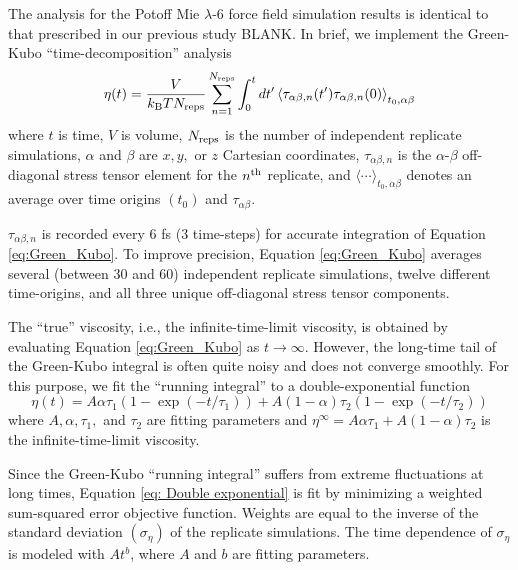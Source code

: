 \documentclass[preprint,review,12pt]{elsarticle}
\begin{document}
	The analysis for the Potoff Mie $\lambda$-6 force field simulation results is identical to that prescribed in our previous study BLANK. In brief, we implement the Green-Kubo ``time-decomposition'' analysis \cite{Maginn2018,Zhang2015}
	\begin{equation} \label{eq:Green_Kubo}
	\eta(t) = \frac{V}{k_{\rm B} T N_{\rm reps}} \sum_{n=1}^{N_{\rm reps}} \int_{0}^{t}dt'\left\langle \tau_{\alpha\beta,n}(t') \tau_{\alpha\beta,n}(0)\right\rangle_{t_0,\alpha\beta}
	\end{equation} 
	where $t$ is time, $V$ is volume, $N_{\rm reps}$ is the number of independent replicate simulations, $\alpha$ and $\beta$ are $x, y, $ or $z$ Cartesian coordinates, $\tau_{\alpha\beta,n}$ is the $\alpha$-$\beta$ off-diagonal stress tensor element for the $n^{\rm th}$ replicate, and $\langle \cdots \rangle_{t_0,\alpha\beta}$ denotes an average over time origins $(t_0)$ and $\tau_{\alpha\beta}$. 
	
	$\tau_{\alpha\beta,n}$ is recorded every 6 fs (3 time-steps) for accurate integration of Equation \ref{eq:Green_Kubo}. To improve precision, Equation \ref{eq:Green_Kubo} averages several (between 30 and 60) independent replicate simulations, twelve different time-origins, and all three unique off-diagonal stress tensor components.
	
	The ``true'' viscosity, i.e., the infinite-time-limit viscosity, is obtained by evaluating Equation \ref{eq:Green_Kubo} as $t \rightarrow \infty$. However, the long-time tail of the Green-Kubo integral is often quite noisy and does not converge smoothly. For this purpose, we fit the ``running integral'' to a double-exponential function
	\begin{equation} \label{eq: Double exponential}
	\eta(t) = A \alpha \tau_1 \left(1-\exp{(-t/\tau_1)}\right) + A (1-\alpha) \tau_2 \left(1-\exp{(-t/\tau_2)}\right)
	\end{equation}
	where $A, \alpha, \tau_1, $ and $\tau_2$ are fitting parameters and $\eta^\infty = A \alpha \tau_1 + A (1-\alpha) \tau_2$ is the infinite-time-limit viscosity. 
		
	Since the Green-Kubo ``running integral'' suffers from extreme fluctuations at long times, Equation \ref{eq: Double exponential} is fit by minimizing a weighted sum-squared error objective function. Weights are equal to the inverse of the standard deviation $(\sigma_{\eta})$ of the replicate simulations. The time dependence of $\sigma_{\eta}$ is modeled with $A t^{b}$, where $A$ and $b$ are fitting parameters.
	
\end{document}
